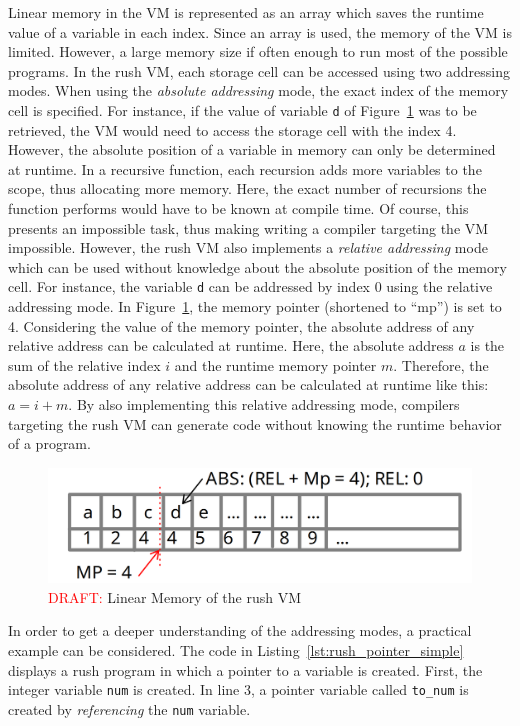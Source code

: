 Linear memory in the VM is represented as an array which saves the runtime value of a variable in each index.
Since an array is used, the memory of the VM is limited.
However, a large memory size if often enough to run most of the possible programs.
In the rush VM, each storage cell can be accessed using two addressing modes.
When using the \emph{absolute addressing} mode, the exact index of the memory cell is specified.
For instance, if the value of variable \texttt{d} of Figure~\ref{fig:rush_vm_linmem} was to be retrieved, the VM would need to access the storage cell with the index 4.
However, the absolute position of a variable in memory can only be determined at runtime.
In a recursive function, each recursion adds more variables to the scope, thus allocating more memory.
Here, the exact number of recursions the function performs would have to be known at compile time.
Of course, this presents an impossible task, thus making writing a compiler targeting the VM impossible.
However, the rush VM also implements a \emph{relative addressing} mode which can be used without knowledge about the absolute position of the memory cell.
For instance, the variable \texttt{d} can be addressed by index 0 using the relative addressing mode.
In Figure~\ref{fig:rush_vm_linmem}, the memory pointer (shortened to \enquote{mp}) is set to 4.
Considering the value of the memory pointer, the absolute address of any relative address can be calculated at runtime.
Here, the absolute address $a$ is the sum of the relative index $i$ and the runtime memory pointer $m$.
Therefore, the absolute address of any relative address can be calculated at runtime like this: $a = i + m$.
By also implementing this relative addressing mode,
compilers targeting the rush VM can generate code without knowing the runtime behavior of a program.

\begin{figure}[h]
	\includegraphics[width=\textwidth]{./vm_linmem_draft.png}
	\caption{\textcolor{red}{DRAFT:} Linear Memory of the rush VM}
	\label{fig:rush_vm_linmem}
\end{figure}

In order to get a deeper understanding of the addressing modes, a practical example can be considered.
The code in Listing~\ref{lst:rush_pointer_simple} displays a rush program in which a pointer to a variable is created.
First, the integer variable \texttt{num} is created.
In line 3, a pointer variable called \texttt{to\_num} is created by \emph{referencing} the \texttt{num} variable.

